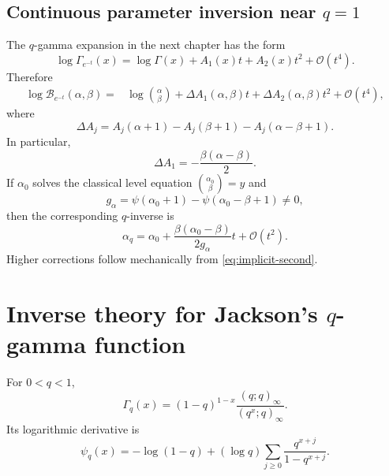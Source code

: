 \documentclass[11pt,oneside]{book}
\theoremstyle{definition}
\theoremstyle{remark}
\newcommand{\OO}{\mathcal{O}}
\begin{document}
\section{Continuous parameter inversion near $q=1$}
The $q$-gamma expansion in the next chapter has the form
\[
 \log\Gamma_{e^{-t}}(x)=\log\Gamma(x)+A_1(x)t+A_2(x)t^2+\OO(t^4).
\]
Therefore
\begin{align}
 \log\mathcal B_{e^{-t}}(\alpha,\beta)
={}&\log\binom{\alpha}{\beta}
 +\Delta A_1(\alpha,\beta)t
 +\Delta A_2(\alpha,\beta)t^2+\OO(t^4),
 \label{eq:continuous-qbinom-qone}
\end{align}
where
\[
 \Delta A_j=A_j(\alpha+1)-A_j(\beta+1)
              -A_j(\alpha-\beta+1).
\]
In particular,
\begin{equation}\label{eq:delta-A1}
 \Delta A_1=-\frac{\beta(\alpha-\beta)}2.
\end{equation}
If $\alpha_0$ solves the classical level equation
$\binom{\alpha_0}{\beta}=y$ and
\[
 g_\alpha=\psi(\alpha_0+1)-\psi(\alpha_0-\beta+1)\ne0,
\]
then the corresponding $q$-inverse is
\begin{equation}\label{eq:continuous-alpha-qcorrection}
 \alpha_q=\alpha_0+
 \frac{\beta(\alpha_0-\beta)}{2g_\alpha}t+\OO(t^2).
\end{equation}
Higher corrections follow mechanically from
\eqref{eq:implicit-second}.

\chapter{Inverse theory for Jackson's $q$-gamma function}

For $0<q<1$,
\begin{equation}\label{eq:qgamma-def}
 \Gamma_q(x)=(1-q)^{1-x}\frac{(q;q)_\infty}{(q^x;q)_\infty}.
\end{equation}
Its logarithmic derivative is
\begin{equation}\label{eq:qdigamma}
 \psi_q(x)=-\log(1-q)
 +(\log q)\sum_{j\ge0}\frac{q^{x+j}}{1-q^{x+j}}.
\end{equation}
\end{document}
